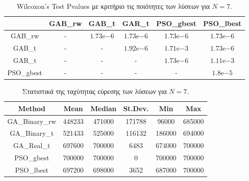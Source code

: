 \documentclass[12pt, a4paper]{article}
\newcommand{\en}{\selectlanguage{english}}
\newcommand{\gr}{\selectlanguage{greek}}
\begin{document}
\begin{table}[H]
	\centering
	\begin{tabular}{| c | c | c | c | c | c |}
		
		\hline
		\en  & \en GAB\_rw & \en GAB\_t & \en GAR\_t & \en PSO\_gbest & \en PSO\_lbest\\
		
		\hline
		\en GAB\_rw & - & $1.73\mathrm{e}{-6}$ & $1.73\mathrm{e}{-6}$ & $1.73\mathrm{e}{-6}$ & $1.73\mathrm{e}{-6}$ \\ 
		
		\hline
		\en GAB\_t & - & - & $1.92\mathrm{e}{-6}$ & $1.71\mathrm{e}{-3}$ & $1.73\mathrm{e}{-6}$ \\ 
		
		\hline
		\en GAR\_t & - & - & - & $1.73\mathrm{e}{-6}$ & $1.11\mathrm{e}{-3}$ \\ 
		
		\hline
		\en PSO\_gbest & - & - & - & - & $1.8\mathrm{e}{-5}$\\ 
		
		\hline
		
	\end{tabular}
	\caption{\en Wilcoxon's Test Pvalues \gr με κριτήριο τις ποιότητες των λύσεων για $N = 7$.}
	\label{tab:sol_qual_pval_N7}
\end{table}

\begin{table}[H]
	\centering
	\begin{tabular}{| c | c | c | c | c | c |}
		
		\hline
		\en Method & \en Mean & \en Median & \en St.Dev. & \en Min & \en Max \\
		
		\hline
		\en GA\_Binary\_rw & 448233 & 471000 & 171788 & 96000 & 685000 \\ 
		
		\hline
		\en GA\_Binary\_t & 521433 & 525000 & 116132 & 186000 & 694000 \\ 
		
		\hline
		\en GA\_Real\_t & 697600 & 700000 & 6483 & 674000 & 700000 \\ 
		
		\hline
		\en PSO\_gbest & 700000 & 700000 & 0 & 700000 & 700000\\ 
		
		\hline
		\en PSO\_lbest & 697200 & 698000 & 3652 & 687000 & 700000 \\ 
		
		\hline
		
	\end{tabular}
	\caption{Στατιστικά της ταχύτητας εύρεσης των λύσεων για $N = 7$.}
	\label{tab:iter_N7}
\end{table}
\end{document}
